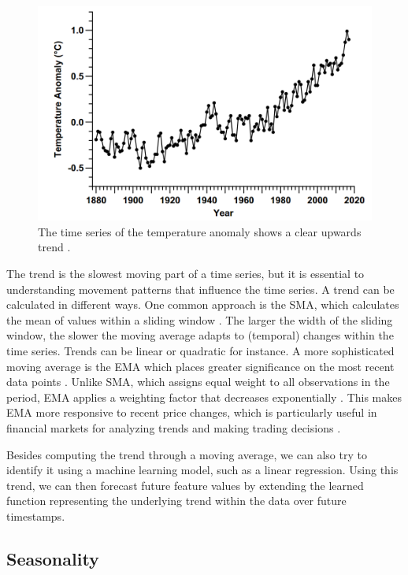 \begin{figure}[h]
    \centering
    \includegraphics[width=0.75\linewidth]{img/Time Series Trend.png}
    \caption{The time series of the temperature anomaly shows a clear upwards trend
        \parencite[p. 311]{mudelsee2019trend}.}
    \label{fig:ts_trend}
\end{figure}

The trend is the slowest moving part of a time series, but it is essential
to understanding movement patterns that influence the time series. A trend can
be calculated in different ways. One common approach is the \ac{SMA}, which
calculates the mean of values within a sliding window \parencite{klinker2011exponential}.
The larger the width of the sliding window, the slower the moving average adapts
to (temporal) changes within the time series. Trends can be linear or quadratic
for instance. A more sophisticated moving average is the \ac{EMA} which places
greater significance on the most recent data points \parencite{hansun2013new}.
Unlike \ac{SMA}, which assigns equal weight to all observations in the period,
\ac{EMA} applies a weighting factor that decreases exponentially
\parencite{klinker2011exponential}. This makes \ac{EMA} more responsive to
recent price changes, which is particularly useful in financial markets for
analyzing trends and making trading decisions \parencite{dzikevivcius2010ema}.

Besides computing the trend through a moving average, we can also try to identify
it using a machine learning model, such as a linear regression. Using this trend, we
can then forecast future feature values by extending the learned function
representing the underlying trend within the data over future timestamps.

\subsection{Seasonality}
\label{subsec:seasonality}

